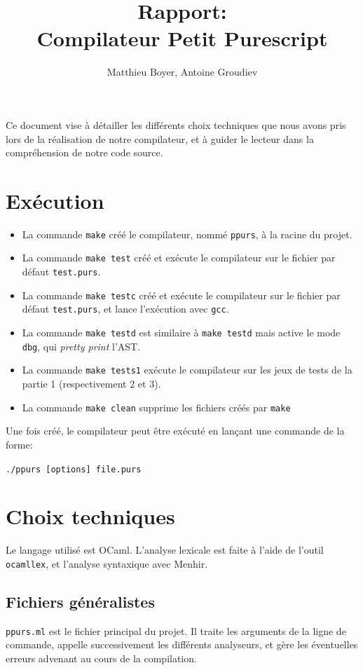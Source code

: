 \documentclass[12pt,a4paper]{article}
\title{\vspace{-3ex} \textbf{Rapport:\\ Compilateur Petit Purescript}}
\author{Matthieu Boyer, Antoine Groudiev}
\date{}
\begin{document}
\maketitle

Ce document vise à détailler les différents choix techniques que nous avons pris lors de la réalisation de notre compilateur, et à guider le lecteur dans la compréhension de notre code source.

\section{Exécution}
\begin{itemize}
    \item La commande \texttt{make} créé le compilateur, nommé \texttt{ppurs}, à la racine du projet.
    \item La commande \texttt{make test} créé et exécute le compilateur sur le fichier par défaut \texttt{test.purs}.
    \item La commande \texttt{make testc} créé et exécute le compilateur sur le fichier par défaut \texttt{test.purs}, et lance l'exécution avec \texttt{gcc}.
    \item La commande \texttt{make testd} est similaire à \texttt{make testd} mais active le mode \texttt{dbg}, qui \emph{pretty print} l'AST.
    \item La commande \texttt{make tests1} exécute le compilateur sur les jeux de tests de la partie 1 (respectivement 2 et 3).
    \item La commande \texttt{make clean} supprime les fichiers créés par \texttt{make}
\end{itemize}

Une fois créé, le compilateur peut être exécuté en lançant une commande de la forme:
\begin{center}
    \texttt{./ppurs [options] file.purs}
\end{center}

\section{Choix techniques}
Le langage utilisé est OCaml. L'analyse lexicale est faite à l'aide de l'outil \texttt{ocamllex}, et l'analyse syntaxique avec Menhir.

\subsection{Fichiers généralistes}
\texttt{ppurs.ml} est le fichier principal du projet. Il traite les arguments de la ligne de commande, appelle successivement les différents analyseurs, et gère les éventuelles erreurs advenant au cours de la compilation.
\end{document}
